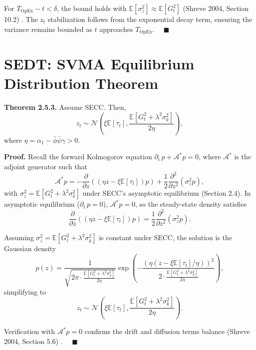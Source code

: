 \documentclass[12pt]{report}
\begin{document}
For \(T_{\text{OpEx}} - t < \delta\), the bound holds with \(\mathbb{E}[\sigma_z^2] \approx \mathbb{E}[G_t^2]\) (Shreve 2004, Section 10.2) \cite{shreve2004}. The \(z_t\) stabilization follows from the exponential decay term, ensuring the variance remains bounded as \(t\) approaches \(T_{\text{OpEx}}\). \(\quad\blacksquare\)

\section{SEDT: SVMA Equilibrium Distribution Theorem}

\textbf{Theorem 2.5.3.} Assume SECC. Then,
\[
    z_t \sim \mathcal{N}\left(\xi \mathbb{E}[\tau_t], \frac{\mathbb{E}[G_t^2 + \lambda^2 \sigma_k^2]}{2 \eta}\right),
\]
where \(\eta = \alpha_1 - \bar{\phi} \bar{\psi} \gamma > 0\).

\vspace{0.2in}

\textbf{Proof.} Recall the forward Kolmogorov equation \(\partial_t\,p + \mathcal{A}^* p = 0\), where \(\mathcal{A}^*\) is the adjoint generator such that
\[
    \mathcal{A}^* p = -\frac{\partial}{\partial z} \left((\eta z - \xi \mathbb{E}[\tau_t]) p\right) + \frac{1}{2} \frac{\partial^2}{\partial z^2} (\sigma_z^2 p),
\]
with \(\sigma_z^2 = \mathbb{E}[G_t^2 + \lambda^2 \sigma_k^2]\) under SECC’s asymptotic equilibrium (Section 2.4). In asymptotic equilibrium (\(\partial_t\,p = 0\)), \(\mathcal{A}^* p = 0\), so the steady-state density satisfies
\[
    \frac{\partial}{\partial z} ((\eta z - \xi \mathbb{E}[\tau_t]) p) = \frac{1}{2} \frac{\partial^2}{\partial z^2} (\sigma_z^2 p).
\]

Assuming \(\sigma_z^2 = \mathbb{E}[G_t^2 + \lambda^2 \sigma_k^2]\) is constant under SECC, the solution is the Gaussian density
\[
    p(z) = \frac{1}{\sqrt{2\pi \cdot \frac{\mathbb{E}[G_t^2 + \lambda^2 \sigma_k^2]}{2\eta}}} \exp\left(-\frac{(\eta (z - \xi \mathbb{E}[\tau_t] / \eta))^2}{2 \cdot \frac{\mathbb{E}[G_t^2 + \lambda^2 \sigma_k^2]}{2\eta}}\right),
\]
simplifying to
\[
    z_t \sim \mathcal{N}\left(\xi \mathbb{E}[\tau_t], \frac{\mathbb{E}[G_t^2 + \lambda^2 \sigma_k^2]}{2\eta}\right).
\]

Verification with \(\mathcal{A}^* p = 0\) confirms the drift and diffusion terms balance (Shreve 2004, Section 5.6) \cite{shreve2004}. \(\quad\blacksquare\)
\end{document}
